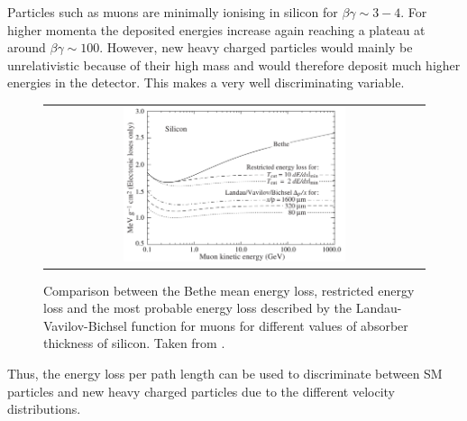 Particles such as  muons are minimally ionising in silicon for $\beta\gamma \sim 3-4$. 
For higher momenta the deposited energies increase again reaching a plateau at around $\beta\gamma\sim100$. 
However, new heavy charged particles would mainly be unrelativistic because of their high mass and would therefore deposit much higher energies in the detector.
This makes \dedx  a very well discriminating variable.
\begin{figure}[!t]
  \centering 
  \begin{tabular}{c}
  \includegraphics[width=0.6\textwidth]{figures/analysis/dEdx_Bethe_Landau.png}
  \end{tabular}
  \caption{Comparison between the Bethe mean energy loss, restricted energy loss and the most probable energy loss described by the Landau-Vavilov-Bichsel function for muons for different values of absorber thickness of silicon. Taken from \cite{bib:PDG_2014}.} 
  \label{fig:dEdx_Bethe_Landau}
\end{figure}
Thus, the energy loss per path length can be used to discriminate between SM particles and new heavy charged particles due to the different velocity distributions.\\



